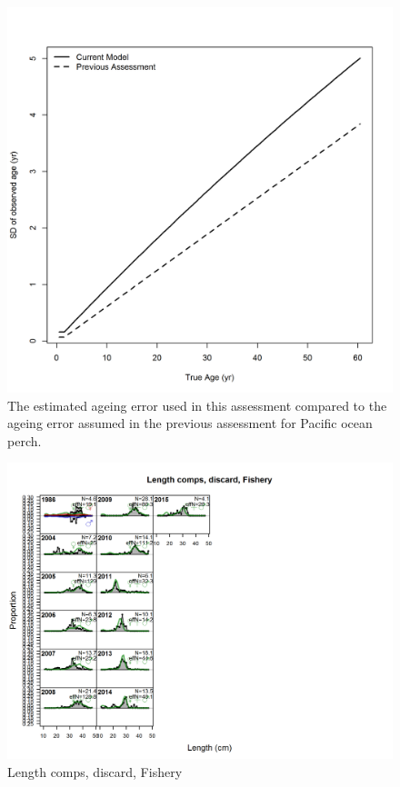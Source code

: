\documentclass[12pt,]{article}
\begin{document}
\begin{figure}
\centering
\includegraphics{Figures/Ageing_Error.png}
\caption{The estimated ageing error used in this assessment compared to
the ageing error assumed in the previous assessment for Pacific ocean
perch. \label{fig:Age_Error}}
\end{figure}

\begin{figure}
\centering
\includegraphics{./r4ss/plots_mod1/comp_lenfit_flt1mkt1.png}
\caption{Length comps, discard, Fishery
\label{fig:mod1_1_comp_lenfit_flt1mkt1}}
\end{figure}
\end{document}
